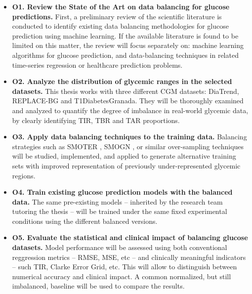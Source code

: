 \begin{itemize}
    \item \textbf{O1. Review the State of the Art on data balancing for glucose predictions.} First, a preliminary review of the scientific literature is conducted to identify existing data balancing methodologies for glucose prediction using machine learning. If the available literature is found to be limited on this matter, the review will focus separately on: machine learning algorithms for glucose prediction, and data-balancing techniques in related time-series regression or healthcare prediction problems.

    \item \textbf{O2. Analyze the distribution of glycemic ranges in the selected datasets.} This thesis works with three different CGM datasets: DiaTrend, REPLACE-BG and T1DiabetesGranada. They will be thoroughly examined and analyzed to quantify the degree of imbalance in real-world glycemic data, by clearly identifying TIR, TBR and TAR proportions.

    \item \textbf{O3. Apply data balancing techniques to the training data.} Balancing strategies such as SMOTER \cite{10.1007/978-3-642-40669-0_33}, SMOGN \cite{pmlr-v74-branco17a}, or similar over-sampling techniques will be studied, implemented, and applied to generate alternative training sets with improved representation of previously under-represented glycemic regions.

    \item \textbf{O4. Train existing glucose prediction models with the balanced data.} The same pre-existing models -- inherited by the research team tutoring the thesis -- will be trained under the same fixed experimental conditions using the different balanced versions.

    \item \textbf{O5. Evaluate the statistical and clinical impact of balancing glucose datasets.} Model performance will be assessed using both conventional reggression metrics -- RMSE, MSE, etc -- and clinically meaningful indicators -- such TIR, Clarke Error Grid, etc. This will allow to distinguish between numerical accuracy and clinical impact. A common normalized, but still imbalanced, baseline will be used to compare the results.
    
\end{itemize}
